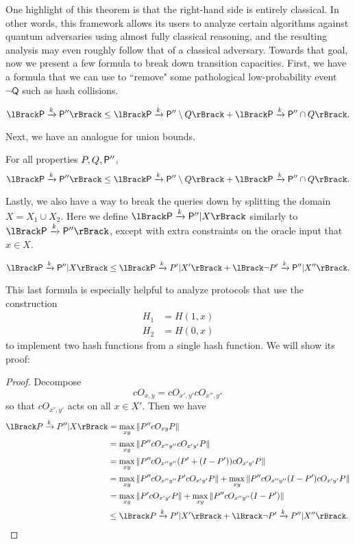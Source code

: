 One highlight of this theorem is that the right-hand side is entirely classical.
In other words, this framework allows its users to analyze certain algorithms against quantum adversaries using almost fully classical reasoning,
and the resulting analysis may even roughly follow that of a classical adversary.
Towards that goal, now we present a few formula to break down transition capacities.
First, we have a formula that we can use to ``remove" some pathological low-probability event $\neg\mathsf{Q}$ such as hash collisions.
\begin{lem}
	$$
	\lBrack\sfP\xrightarrow{k}\sfP''\rBrack\leq
	\lBrack\sfP\xrightarrow{k} \sfP''\setminus Q\rBrack+
	\lBrack\sfP\xrightarrow{k} \sfP''\cap Q\rBrack.
	$$
\end{lem}
Next, we have an analogue for union bounds.
\begin{lem}
For all properties $P, Q, \mathsf{P}''$,
$$
	\lBrack\sfP\xrightarrow{k}\sfP''\rBrack\leq
	\lBrack\sfP\xrightarrow{k} \sfP''\setminus Q\rBrack+
	\lBrack\sfP\xrightarrow{k} \sfP''\cap Q\rBrack.
$$
\end{lem}
Lastly, we also have a way to break the queries down by splitting the domain $X=X_1\cup X_2$.
Here we define $\lBrack\sfP\xrightarrow{k} \sfP''|X\rBrack$ similarly to $\lBrack\sfP\xrightarrow{k} \sfP''\rBrack$,
except with extra constraints on the oracle input that $x\in X$.
\begin{lem}
$$
	\lBrack\sfP\xrightarrow{k} \sfP''|X\rBrack\leq
	\lBrack\sfP\xrightarrow{k} P'|X'\rBrack+
	\lBrack\neg P'\xrightarrow{k} \sfP''|X''\rBrack.
$$
\end{lem}
This last formula is especially helpful to analyze protocols that use the construction
\begin{align*}
	H_1&=H(1, x) \\
	H_2&=H(0, x)
\end{align*}
to implement two hash functions from a single hash function.
We will show its proof:
\begin{proof}
	Decompose
	$$cO_{x,y}=cO_{x',y'}cO_{x'',y''}$$
	so that $cO_{x',y'}$ acts on all $x\in X'$.
	Then we have
\begin{align*}
	\lBrack P\xrightarrow{k} P''|X\rBrack &=\max_{xy}\norm{P''cO_{xy}P}\\
			&=\max_{xy}\norm{P''cO_{x''y''}cO_{x'y'}P}\\
			&=\max_{xy}\norm{P''cO_{x''y''}(P' + (I - P'))cO_{x'y'}P}\\
			&=\max_{xy}\norm{P''cO_{x''y''}P' cO_{x'y'}P}
			+\max_{xy}\norm{P''cO_{x''y''}(I - P')cO_{x'y'}P}\\
			&=\max_{xy}\norm{P' cO_{x'y'}P}
			+\max_{xy}\norm{P''cO_{x''y''}(I - P')}\\
			&\leq
			\lBrack P\xrightarrow{k} P'|X'\rBrack +
			\lBrack \neg P'\xrightarrow{k} P''|X''\rBrack .
\end{align*}
\end{proof}

